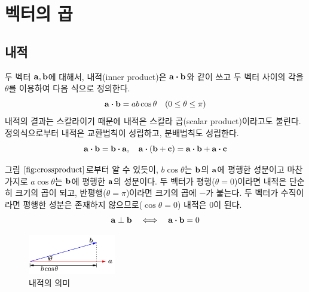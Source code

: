 \documentclass[a4paper,twoside,11pt]{book}
\begin{document}
\section{벡터의 곱}

\subsection{내적}
두 벡터 $\vb{a}, \vb{b}$에 대해서, 내적(inner product)은 $\vb{a} \vdot \vb{b}$와 같이 쓰고 두 벡터 사이의 각을 $\theta$를 이용하여 다음 식으로 정의한다.
\[\vb{a} \vdot \vb{b} = ab \cos{\theta} \quad (0 \leq \theta \leq \pi)
\]
내적의 결과는 스칼라이기 때문에 내적은 스칼라 곱(scalar product)이라고도 불린다. 정의식으로부터 내적은 교환법칙이 성립하고, 분배법칙도 성립한다.
\[\vb{a} \vdot \vb{b} = \vb{b} \vdot \vb{a}, \quad \vb{a} \vdot (\vb{b} + \vb{c}) = \vb{a} \vdot \vb{b} + \vb{a} \vdot \vb{c}
\]

그림 $\ref{fig:crossproduct}$로부터 알 수 있듯이, $b \cos{\theta}$는 $\vb{b}$의 $\vb{a}$에 평행한 성분이고 마찬가지로 $a \cos{\theta}$는 $\vb{b}$에 평행한 $\vb{a}$의 성분이다. 두 벡터가 평행($\theta = 0$)이라면 내적은 단순히 크기의 곱이 되고, 반평행($\theta = \pi$)이라면 크기의 곱에 $-$가 붙는다. 두 벡터가 수직이라면 평행한 성분은 존재하지 않으므로($\cos{\theta}=0$) 내적은 0이 된다.
\[
\vb{a} \perp \vb{b} \quad \Longleftrightarrow \quad \vb{a} \vdot \vb{b} = 0  
\]

\begin{figure}
  \centering
  \includegraphics[width=0.34\textwidth]{images/fig1-4}
  \caption{내적의 의미}
  \label{fig:crossproduct}
\end{figure}
\end{document}
